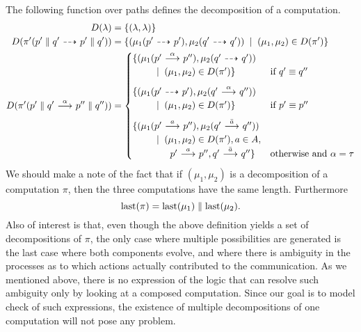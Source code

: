 The following function over paths defines the decomposition of a computation.
\begin{align*}
    D(\lambda) &= \{(\lambda,\lambda)\} \\
    D(\pi'(p'\parallel q' \ {\stackrel{_{}}{\dashrightarrow}}\  p'\parallel q')) &=
        \{(\mu_1(p'\ {\stackrel{_{}}{\dashrightarrow}}\ p'),\mu_2(q'\ {\stackrel{_{}}{\dashrightarrow}}\ q')) \;\;|\;\; (\mu_1,\mu_2)\in D(\pi')\} \\
    D(\pi'(p'\parallel q' \ {\stackrel{{\alpha}}{\longrightarrow}}\  p''\parallel q'')) &=
        \begin{cases}
            \{(\mu_1(p' \ {\stackrel{{\alpha}}{\longrightarrow}}\  p''), \mu_2(q' \ {\stackrel{_{}}{\dashrightarrow}}\  q')) \\ \quad\quad
                \;\;|\;\; (\mu_1,\mu_2) \in D(\pi')\} & \textrm{if $q'\equiv q''$} \\[0.7em]
            \{(\mu_1(p' \ {\stackrel{_{}}{\dashrightarrow}}\  p'), \mu_2(q'\ {\stackrel{{\alpha}}{\longrightarrow}}\  q'')) \\ \quad\quad
                \;\;|\;\; (\mu_1,\mu_2) \in D(\pi')\} & \textrm{if $p'\equiv p''$} \\[0.7em]
            \{(\mu_1(p'\ {\stackrel{{a}}{\longrightarrow}}\ p''), \mu_2(q'\ {\stackrel{{\bar{a}}}{\longrightarrow}}\ q'')) \\ \quad\quad
                \;\;|\;\; (\mu_1,\mu_2) \in D(\pi'), a\in A, \\
                \qquad\qquad p'\ {\stackrel{{a}}{\longrightarrow}}\ p'', q'\ {\stackrel{{\bar{a}}}{\longrightarrow}}\ q''\}
                & \textrm{otherwise and $\alpha=\tau$}
        \end{cases}
\end{align*}
We should make a note of the fact that if $(\mu_1,\mu_2)$ is a decomposition
of a computation $\pi$, then the three computations have the same length.
Furthermore
\begin{equation}\label{eq:last_equals_last}
    \operatorname{last}(\pi) = \operatorname{last}(\mu_1) \parallel \operatorname{last}(\mu_2).
\end{equation}
%
Also of interest
is that, even though the above definition yields a set of decompositions of $\pi$, the only
case where multiple possibilities are generated is the last case where both components
evolve, and where there is ambiguity in the processes as to which actions actually
contributed to the communication. As we mentioned above, there is no expression
of the \HMLpast{} logic that can resolve such ambiguity only by looking at a composed
computation.
Since our goal is to model check of such expressions, the
existence of multiple decompositions of one computation will not pose any problem.

